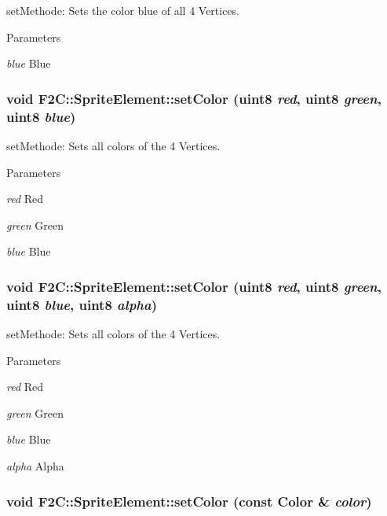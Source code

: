 setMethode: Sets the color blue of all 4 Vertices. 
\begin{DoxyParams}{Parameters}
\item[{\em blue}]Blue \end{DoxyParams}
\hypertarget{class_f2_c_1_1_sprite_element_adb9192dc0d48987416570e4c3f470fe2}{
\subsubsection[{setColor}]{\setlength{\rightskip}{0pt plus 5cm}void F2C::SpriteElement::setColor ({\bf uint8} {\em red}, \/  {\bf uint8} {\em green}, \/  {\bf uint8} {\em blue})}}
\label{class_f2_c_1_1_sprite_element_adb9192dc0d48987416570e4c3f470fe2}


setMethode: Sets all colors of the 4 Vertices. 
\begin{DoxyParams}{Parameters}
\item[{\em red}]Red \item[{\em green}]Green \item[{\em blue}]Blue \end{DoxyParams}
\hypertarget{class_f2_c_1_1_sprite_element_abd8a9e793229dcc55eb2d80741e53e04}{
\subsubsection[{setColor}]{\setlength{\rightskip}{0pt plus 5cm}void F2C::SpriteElement::setColor ({\bf uint8} {\em red}, \/  {\bf uint8} {\em green}, \/  {\bf uint8} {\em blue}, \/  {\bf uint8} {\em alpha})}}
\label{class_f2_c_1_1_sprite_element_abd8a9e793229dcc55eb2d80741e53e04}


setMethode: Sets all colors of the 4 Vertices. 
\begin{DoxyParams}{Parameters}
\item[{\em red}]Red \item[{\em green}]Green \item[{\em blue}]Blue \item[{\em alpha}]Alpha \end{DoxyParams}
\hypertarget{class_f2_c_1_1_sprite_element_a4df44dffcfef51f23b22fe578f2676d0}{
\subsubsection[{setColor}]{\setlength{\rightskip}{0pt plus 5cm}void F2C::SpriteElement::setColor (const {\bf Color} \& {\em color})}}
\label{class_f2_c_1_1_sprite_element_a4df44dffcfef51f23b22fe578f2676d0}


